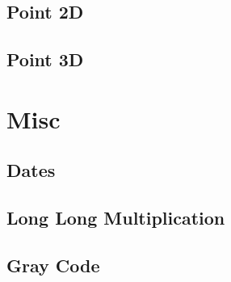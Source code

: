 \documentclass[10pt]{article}
\begin{document}
\subsection{Point 2D}

\subsection{Point 3D}




\newpage
\section{Misc}
\subsection{Dates}

\subsection{Long Long Multiplication}

\subsection{Gray Code}




\newpage

\end{document}
